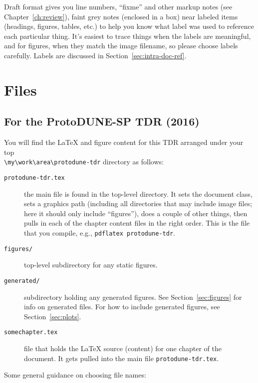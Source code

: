 Draft format gives you line numbers, ``fixme'' and other markup notes (see Chapter~\ref{ch:review}), 
faint grey notes (enclosed in a box) near labeled items (headings, figures, tables, etc.) to help you know 
what label was used to reference each particular thing.  
It's easiest to trace things when the labels are meaningful, and for figures, when they match the image filename, so please choose labels carefully. Labels are discussed in Section~\ref{sec:intra-doc-ref}.

\section{Files}
\label{sec:files}

\subsection{For the ProtoDUNE-SP TDR (2016)}
\label{ssec:files-pdunesp-tdr}

You will find the \LaTeX{} and figure content for this TDR
arranged under your top\\ \verb|\my\work\area\protodune-tdr| directory as follows:

\begin{description}
\item[\texttt{protodune-tdr.tex}] the main file is found in the top-level
  directory. It sets the document class, sets a graphics path (including all directories that may include image files; here it should only include ``figures''), does a couple of other things, then pulls in each of the chapter content files in the right order.  This is the file that you compile, e.g., \verb|pdflatex protodune-tdr|.
\item[\texttt{figures/}] top-level subdirectory for any static figures.
\item[\texttt{generated/}] subdirectory holding any generated
  figures. See Section~\ref{sec:figures} for info on generated files. For how to include generated figures, see Section~\ref{sec:plots}.
\item[\texttt{somechapter.tex}] file that holds the \LaTeX{} source (content) for one
  chapter of the document. It gets pulled into the main file \texttt{protodune-tdr.tex}.
\end{description}

Some general guidance on choosing file names:

